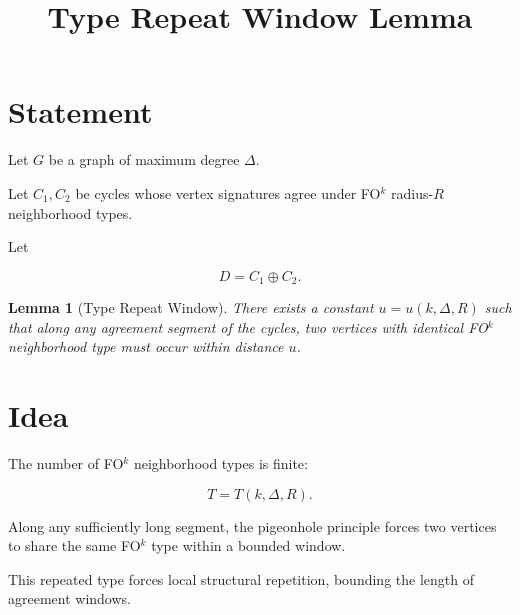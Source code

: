 \documentclass[11pt]{article}
\title{Type Repeat Window Lemma}
\date{}
\newtheorem{lemma}{Lemma}
\begin{document}
\maketitle

\section*{Statement}

Let \(G\) be a graph of maximum degree \(\Delta\).

Let \(C_1,C_2\) be cycles whose vertex signatures agree under
FO\(^k\) radius-\(R\) neighborhood types.

Let

\[
D = C_1 \oplus C_2 .
\]

\begin{lemma}[Type Repeat Window]

There exists a constant \(u=u(k,\Delta,R)\) such that along any
agreement segment of the cycles, two vertices with identical
FO\(^k\) neighborhood type must occur within distance \(u\).

\end{lemma}

\section*{Idea}

The number of FO\(^k\) neighborhood types is finite:

\[
T = T(k,\Delta,R).
\]

Along any sufficiently long segment, the pigeonhole principle forces
two vertices to share the same FO\(^k\) type within a bounded window.

This repeated type forces local structural repetition, bounding the
length of agreement windows.
\end{document}

